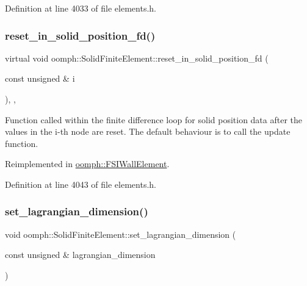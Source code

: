 Definition at line 4033 of file elements.\+h.

\mbox{\label{classoomph_1_1SolidFiniteElement_a99e4613b1ac5f202c837c0e556f7b917}} 
\subsubsection{\texorpdfstring{reset\+\_\+in\+\_\+solid\+\_\+position\+\_\+fd()}{reset\_in\_solid\_position\_fd()}}
{\footnotesize\ttfamily virtual void oomph\+::\+Solid\+Finite\+Element\+::reset\+\_\+in\+\_\+solid\+\_\+position\+\_\+fd (\begin{DoxyParamCaption}\item[{const unsigned \&}]{i }\end{DoxyParamCaption})\hspace{0.3cm}{\ttfamily [inline]}, {\ttfamily [protected]}, {\ttfamily [virtual]}}



Function called within the finite difference loop for solid position data after the values in the i-\/th node are reset. The default behaviour is to call the update function. 



Reimplemented in \hyperlink{classoomph_1_1FSIWallElement_aa7a250a0958768f5393484ea3c528a37}{oomph\+::\+F\+S\+I\+Wall\+Element}.



Definition at line 4043 of file elements.\+h.

\mbox{\label{classoomph_1_1SolidFiniteElement_afae461c6679212165a47829662d0274d}} 
\subsubsection{\texorpdfstring{set\+\_\+lagrangian\+\_\+dimension()}{set\_lagrangian\_dimension()}}
{\footnotesize\ttfamily void oomph\+::\+Solid\+Finite\+Element\+::set\+\_\+lagrangian\+\_\+dimension (\begin{DoxyParamCaption}\item[{const unsigned \&}]{lagrangian\+\_\+dimension }\end{DoxyParamCaption})\hspace{0.3cm}{\ttfamily [inline]}}



